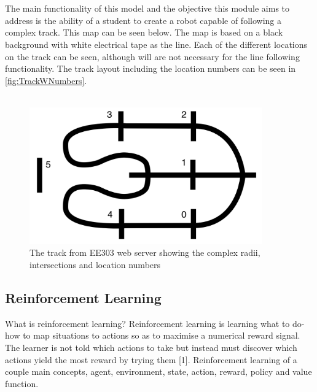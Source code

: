 \documentclass[a4paper,12pt]{article}
\begin{document}
\\\\
The main functionality of this model and the objective this module aims to address is the ability of a student to create a robot capable of following a complex track. This map can be seen below. The map is based on a black background with white electrical tape as the line. Each of the different locations on the track can be seen, although will are not necessary for the line following functionality. The track layout including the location numbers can be seen in \autoref{fig:TrackWNumbers}.
\\\\
\begin{figure}[H]
\centering
\includegraphics[width=10cm]{imgs/TrackWNumbers.png}
\caption{The track from EE303 web server showing the complex radii, intersections and location numbers \cite{KevinMcGuinness}}
\label{fig:TrackWNumbers}
\end{figure}

\subsection{Reinforcement Learning}

What is reinforcement learning? Reinforcement learning is learning what to do-how to map situations to actions so as to maximise a numerical reward signal. The learner is not told which actions to take but instead must discover which actions yield the most reward by trying them [1]. Reinforcement learning of a couple main concepts, agent, environment, state, action, reward, policy and value function.
\end{document}
